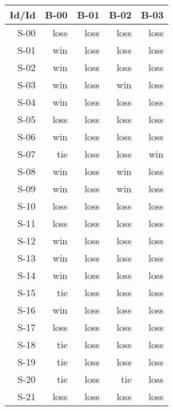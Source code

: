\begin{tabular}{ | r | r | r | r | r | }
    \hline
        Id/Id  &   B-00  &   B-01  &   B-02  &   B-03  \\
    \hline
    \hline
         S-00  &   loss  &   loss  &   loss  &   loss  \\
    \hline
         S-01  &    win  &   loss  &   loss  &   loss  \\
    \hline
         S-02  &    win  &   loss  &   loss  &   loss  \\
    \hline
         S-03  &    win  &   loss  &    win  &   loss  \\
    \hline
         S-04  &    win  &   loss  &   loss  &   loss  \\
    \hline
         S-05  &   loss  &   loss  &   loss  &   loss  \\
    \hline
         S-06  &    win  &   loss  &   loss  &   loss  \\
    \hline
         S-07  &    tie  &   loss  &   loss  &    win  \\
    \hline
         S-08  &    win  &   loss  &    win  &   loss  \\
    \hline
         S-09  &    win  &   loss  &    win  &   loss  \\
    \hline
         S-10  &   loss  &   loss  &   loss  &   loss  \\
    \hline
         S-11  &   loss  &   loss  &   loss  &   loss  \\
    \hline
         S-12  &    win  &   loss  &   loss  &   loss  \\
    \hline
         S-13  &    win  &   loss  &   loss  &   loss  \\
    \hline
         S-14  &    win  &   loss  &   loss  &   loss  \\
    \hline
         S-15  &    tie  &   loss  &   loss  &   loss  \\
    \hline
         S-16  &    win  &   loss  &   loss  &   loss  \\
    \hline
         S-17  &   loss  &   loss  &   loss  &   loss  \\
    \hline
         S-18  &    tie  &   loss  &   loss  &   loss  \\
    \hline
         S-19  &    tie  &   loss  &   loss  &   loss  \\
    \hline
         S-20  &    tie  &   loss  &    tie  &   loss  \\
    \hline
         S-21  &   loss  &   loss  &   loss  &   loss  \\

\end{tabular}
